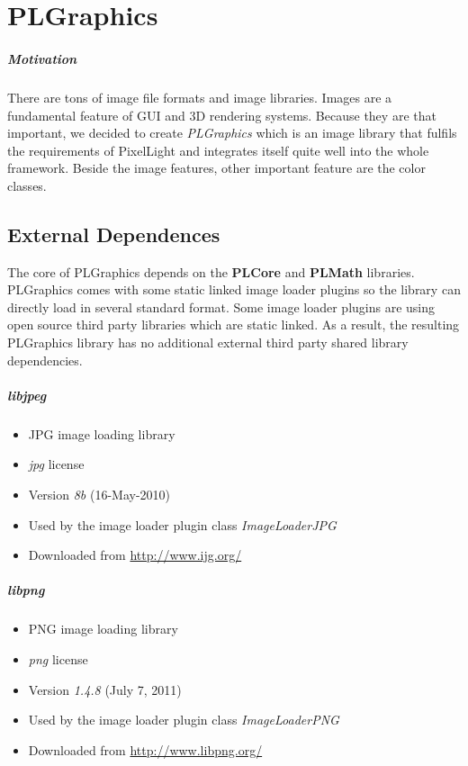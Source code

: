 \chapter{PLGraphics}


\paragraph{Motivation}
There are tons of image file formats and image libraries. Images are a fundamental feature of GUI and 3D rendering systems. Because they are that important, we decided to create \emph{PLGraphics} which is an image library that fulfils the requirements of PixelLight and integrates itself quite well into the whole framework. Beside the image features, other important feature are the color classes.




\section{External Dependences}
The core of PLGraphics depends on the \textbf{PLCore} and \textbf{PLMath} libraries. PLGraphics comes with some static linked image loader plugins so the library can directly load in several standard format. Some image loader plugins are using open source third party libraries which are static linked. As a result, the resulting PLGraphics library has no additional external third party shared library dependencies.


\paragraph{libjpeg}
\begin{itemize}
\item JPG image loading library
\item \emph{jpg} license
\item Version \emph{8b} (16-May-2010)
\item Used by the image loader plugin class \emph{ImageLoaderJPG}
\item Downloaded from \url{http://www.ijg.org/}
\end{itemize}


\paragraph{libpng}
\begin{itemize}
\item PNG image loading library
\item \emph{png} license
\item Version \emph{1.4.8} (July 7, 2011)
\item Used by the image loader plugin class \emph{ImageLoaderPNG}
\item Downloaded from \url{http://www.libpng.org/}
\end{itemize}





\cleardoublepage
